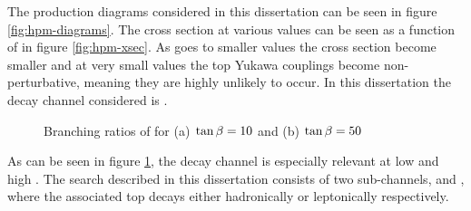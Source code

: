 	The production diagrams considered in this dissertation can be seen in figure \ref{fig:hpm-diagrams}. The cross section at various \tanb values can be seen as a function of \mHpm in figure \ref{fig:hpm-xsec}. As \tanb goes to smaller values the \Hpm cross section become smaller and at very small values the top Yukawa couplings become non-perturbative, meaning they are highly unlikely to occur. In this dissertation the decay channel considered is \HpmLong. 
	\begin{figure}[!ht]
		\centering
		\caption{\label{fig:hpm-br} Branching ratios of \Hpm for (a) $\tan\beta = 10$ and (b) $\tan\beta = 50$ ~\cite{Heinemeyer:2013tqa} }
	\end{figure}
	As can be seen in figure \ref{fig:hpm-br}, the \HpmLong decay channel is especially relevant at low \mHpm and high \tanb. The search described in this dissertation consists of two sub-channels, \taujets and \taulep, where the associated top decays either hadronically or leptonically respectively. 

